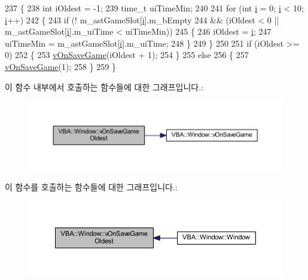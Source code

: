 \begin{DoxyCode}
237 \{
238   \textcolor{keywordtype}{int}    iOldest = -1;
239   time\_t uiTimeMin;
240 
241   \textcolor{keywordflow}{for} (\textcolor{keywordtype}{int} \mbox{\hyperlink{expr-lex_8cpp_acb559820d9ca11295b4500f179ef6392}{i}} = 0; \mbox{\hyperlink{expr-lex_8cpp_acb559820d9ca11295b4500f179ef6392}{i}} < 10; \mbox{\hyperlink{expr-lex_8cpp_acb559820d9ca11295b4500f179ef6392}{i}}++)
242   \{
243     \textcolor{keywordflow}{if} (! m\_astGameSlot[\mbox{\hyperlink{expr-lex_8cpp_acb559820d9ca11295b4500f179ef6392}{i}}].m\_bEmpty
244         && (iOldest < 0 || m\_astGameSlot[\mbox{\hyperlink{expr-lex_8cpp_acb559820d9ca11295b4500f179ef6392}{i}}].m\_uiTime < uiTimeMin))
245     \{
246       iOldest = \mbox{\hyperlink{expr-lex_8cpp_acb559820d9ca11295b4500f179ef6392}{i}};
247       uiTimeMin = m\_astGameSlot[\mbox{\hyperlink{expr-lex_8cpp_acb559820d9ca11295b4500f179ef6392}{i}}].m\_uiTime;
248     \}
249   \}
250 
251   \textcolor{keywordflow}{if} (iOldest >= 0)
252   \{
253     \mbox{\hyperlink{class_v_b_a_1_1_window_aa614f13101a25febb6f3c3805c947e3e}{vOnSaveGame}}(iOldest + 1);
254   \}
255   \textcolor{keywordflow}{else}
256   \{
257     \mbox{\hyperlink{class_v_b_a_1_1_window_aa614f13101a25febb6f3c3805c947e3e}{vOnSaveGame}}(1);
258   \}
259 \}
\end{DoxyCode}
이 함수 내부에서 호출하는 함수들에 대한 그래프입니다.\+:
\nopagebreak
\begin{figure}[H]
\begin{center}
\leavevmode
\includegraphics[width=350pt]{class_v_b_a_1_1_window_ac582c9416136eaaf39469fc9eff83fee_cgraph}
\end{center}
\end{figure}
이 함수를 호출하는 함수들에 대한 그래프입니다.\+:
\nopagebreak
\begin{figure}[H]
\begin{center}
\leavevmode
\includegraphics[width=350pt]{class_v_b_a_1_1_window_ac582c9416136eaaf39469fc9eff83fee_icgraph}
\end{center}
\end{figure}
\mbox{\label{class_v_b_a_1_1_window_ac28bedaab2e51b684869e85b4b20b7be}} 
